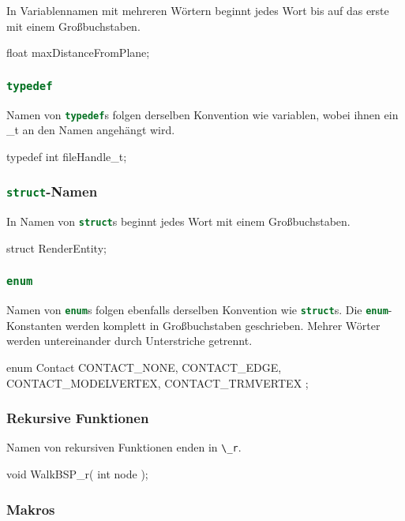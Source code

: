 \documentclass{homework-pp}
\renewcommand{\c}[1]{\lstinline[language=c,basicstyle=\ttfamily]|#1|}
\begin{document}
In Variablennamen mit mehreren Wörtern beginnt jedes Wort bis auf das erste mit einem Großbuchstaben.

\begin{cblock}
float maxDistanceFromPlane;
\end{cblock}

\subsubsection{\c{typedef}}

Namen von \c{typedef}s folgen derselben Konvention wie variablen, wobei ihnen ein \_t an den Namen angehängt wird.

\begin{cblock}
typedef int fileHandle_t;
\end{cblock}

\subsubsection{\c{struct}-Namen}

In Namen von \c{struct}s beginnt jedes Wort mit einem Großbuchstaben.

\begin{cblock}
struct RenderEntity;
\end{cblock}

\subsubsection{\c{enum}}
Namen von \c{enum}s folgen ebenfalls derselben Konvention wie \c{struct}s. Die \c{enum}-Konstanten werden komplett in Großbuchstaben geschrieben. Mehrer Wörter werden untereinander durch Unterstriche getrennt.

\begin{cblock}
enum Contact {
	CONTACT_NONE,
	CONTACT_EDGE,
	CONTACT_MODELVERTEX,
	CONTACT_TRMVERTEX
};
\end{cblock}

\subsubsection{Rekursive Funktionen}

Namen von rekursiven Funktionen enden in \c{\_r}.

\begin{cblock}
void WalkBSP_r( int node );
\end{cblock}

\subsubsection{Makros}
\end{document}
